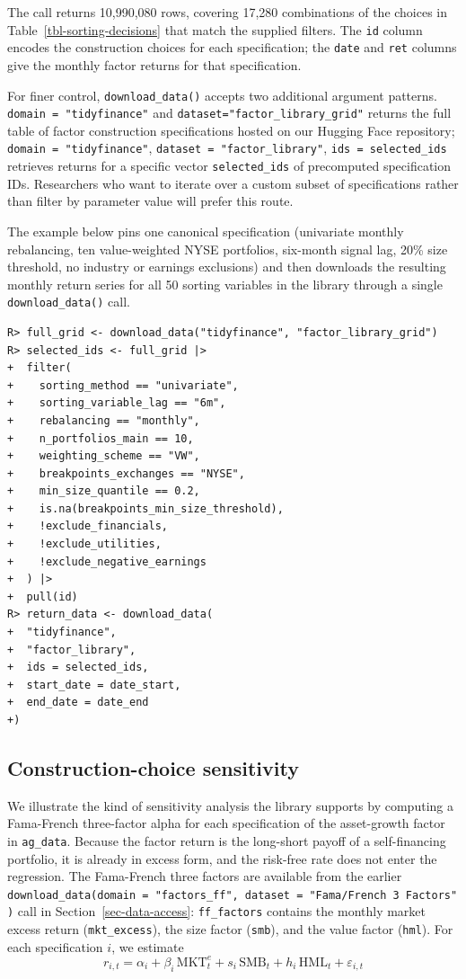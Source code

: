 \documentclass[
  article]{jss}
\begin{document}
The call returns 10,990,080 rows, covering 17,280 combinations of the
choices in Table~\ref{tbl-sorting-decisions} that match the supplied
filters. The \texttt{id} column encodes the construction choices for
each specification; the \texttt{date} and \texttt{ret} columns give the
monthly factor returns for that specification.

For finer control, \texttt{download\_data()} accepts two additional
argument patterns. \texttt{domain\ =\ "tidyfinance"} and
\texttt{dataset="factor\_library\_grid"} returns the full table of
factor construction specifications hosted on our Hugging Face
repository; \texttt{domain\ =\ "tidyfinance"},
\texttt{dataset\ =\ "factor\_library"}, \texttt{ids\ =\ selected\_ids}
retrieves returns for a specific vector \texttt{selected\_ids} of
precomputed specification IDs. Researchers who want to iterate over a
custom subset of specifications rather than filter by parameter value
will prefer this route.

The example below pins one canonical specification (univariate monthly
rebalancing, ten value-weighted NYSE portfolios, six-month signal lag,
20\% size threshold, no industry or earnings exclusions) and then
downloads the resulting monthly return series for all 50 sorting
variables in the library through a single \texttt{download\_data()}
call.

\begin{verbatim}
R> full_grid <- download_data("tidyfinance", "factor_library_grid")
R> selected_ids <- full_grid |>
+  filter(
+    sorting_method == "univariate",
+    sorting_variable_lag == "6m",
+    rebalancing == "monthly",
+    n_portfolios_main == 10,
+    weighting_scheme == "VW",
+    breakpoints_exchanges == "NYSE",
+    min_size_quantile == 0.2,
+    is.na(breakpoints_min_size_threshold),
+    !exclude_financials,
+    !exclude_utilities,
+    !exclude_negative_earnings
+  ) |>
+  pull(id)
R> return_data <- download_data(
+  "tidyfinance",
+  "factor_library",
+  ids = selected_ids,
+  start_date = date_start,
+  end_date = date_end
+)
\end{verbatim}

\subsection{Construction-choice
sensitivity}\label{sec-library-sensitivity}

We illustrate the kind of sensitivity analysis the library supports by
computing a Fama-French three-factor alpha for each specification of the
asset-growth factor in \texttt{ag\_data}. Because the factor return is
the long-short payoff of a self-financing portfolio, it is already in
excess form, and the risk-free rate does not enter the regression. The
Fama-French three factors are available from the earlier
\texttt{download\_data(domain\ =\ "factors\_ff",\ dataset\ =\ "Fama/French\ 3\ Factors")}
call in Section~\ref{sec-data-access}: \texttt{ff\_factors} contains the
monthly market excess return (\texttt{mkt\_excess}), the size factor
(\texttt{smb}), and the value factor (\texttt{hml}). For each
specification \(i\), we estimate \[
r_{i,t} = \alpha_i + \beta_i \, \text{MKT}_t^e + s_i \, \text{SMB}_t + h_i \, \text{HML}_t + \varepsilon_{i,t}
\]
\end{document}
